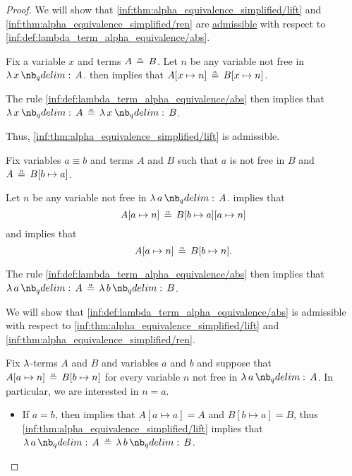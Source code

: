 \begin{proof}
  \SufficiencySubProof We will show that \ref{inf:thm:alpha_equivalence_simplified/lift} and \ref{inf:thm:alpha_equivalence_simplified/ren} are \hyperref[con:inference_rule_admissibility]{admissible} with respect to \ref{inf:def:lambda_term_alpha_equivalence/abs}.

   Fix a variable \( x \) and terms \( A \aequiv B \). Let \( n \) be any variable not free in \( \qabs x A \).  then implies that \( A[x \mapsto n] \aequiv B[x \mapsto n] \).

  The rule \ref{inf:def:lambda_term_alpha_equivalence/abs} then implies that \( \qabs x A \aequiv \qabs x B \).

  Thus, \ref{inf:thm:alpha_equivalence_simplified/lift} is admissible.

   Fix variables \( a \equiv b \) and terms \( A \) and \( B \) such that \( a \) is not free in \( B \) and \( A \aequiv B[b \mapsto a] \).

  Let \( n \) be any variable not free in \( \qabs a A \).  implies that
  \begin{equation*}
    A[a \mapsto n] \aequiv B[b \mapsto a][a \mapsto n]
  \end{equation*}
  and  implies that
  \begin{equation*}
    A[a \mapsto n] \aequiv B[b \mapsto n].
  \end{equation*}

  The rule \ref{inf:def:lambda_term_alpha_equivalence/abs} then implies that \( \qabs a A \aequiv \qabs b B \).

  \NecessitySubProof We will show that \ref{inf:def:lambda_term_alpha_equivalence/abs} is admissible with respect to \ref{inf:thm:alpha_equivalence_simplified/lift} and \ref{inf:thm:alpha_equivalence_simplified/ren}.

  Fix \( \mathrm{\lambda} \)-terms \( A \) and \( B \) and variables \( a \) and \( b \) and suppose that \( A[a \mapsto n] \aequiv B[b \mapsto n] \) for every variable \( n \) not free in \( \qabs a A \). In particular, we are interested in \( n = a \).

  \begin{itemize}
    \item If \( a = b \), then  implies that \( A[a \mapsto a] = A \) and \( B[b \mapsto a] = B \), thus \ref{inf:thm:alpha_equivalence_simplified/lift} implies that \( \qabs a A \aequiv \qabs b B \).


\end{itemize}
\end{proof}
